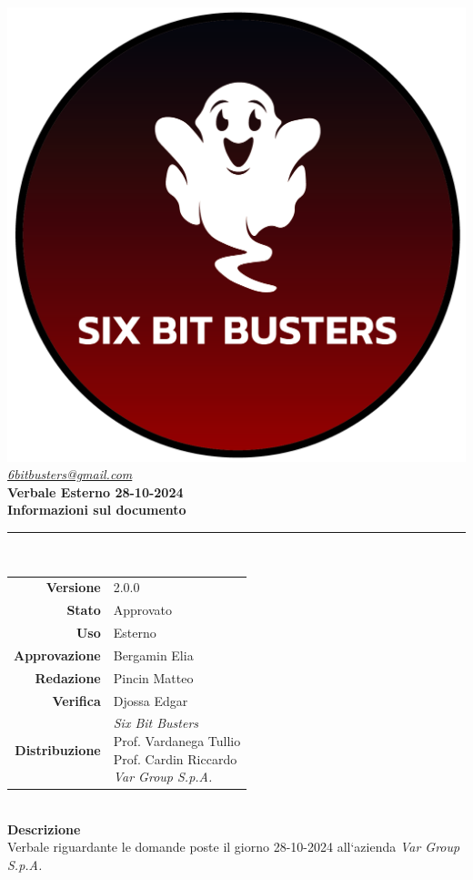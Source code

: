 \thispagestyle{empty}
\renewcommand{\arraystretch}{1.3}


\begin{titlepage}
	\begin{center}
		
	\includegraphics[scale = 0.7]{template/images/logo-circle.png}
	\\[1cm]
	\href{mailto:6bitbusters@gmail.com}		      	
	{\large{\textit{6bitbusters@gmail.com} } }\\[1cm]
	
	\Huge \textbf{Verbale Esterno 28-10-2024} \\[1cm]

	\large \textbf{Informazioni sul documento} \\
	\rule{0.6\textwidth}{0.4pt}
	\\[0.5cm]
	\begin{tabular}{r|l}
		\textbf{Versione} & 2.0.0\\
		\textbf{Stato} & Approvato\\
		\textbf{Uso} & Esterno\\                         
		\textbf{Approvazione} & Bergamin Elia \\                      
		\textbf{Redazione} & Pincin Matteo\\ 
		\textbf{Verifica} & Djossa Edgar\\                         
		\textbf{Distribuzione} & \parbox[t]{5cm}{ \textit{Six Bit Busters} \\ Prof. Vardanega Tullio 
	 \\ Prof. Cardin Riccardo \\ \textit{Var Group S.p.A.}}
	\end{tabular}	
	\\[1.2cm]

	\large \textbf{Descrizione} \\
	Verbale riguardante le domande poste il giorno 28-10-2024 all`azienda \textit{Var Group S.p.A.}
	
	\end{center}
\end{titlepage}
